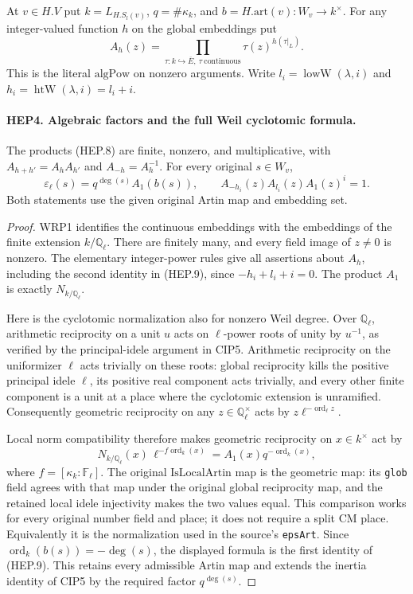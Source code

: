 At $v\in H.V$ put $k=L_{H.S_l(v)}$, $q=\#\kappa_k$, and
$b=H.\mathrm{art}(v):W_v\to k^\times$.
For any integer-valued function $h$ on the global embeddings put
\[
 A_h(z)=\prod_{\tau:k\hookrightarrow\overline E,\ \tau\ \text{continuous}}
                       \tau(z)^{h(\tau|_L)}.
 \tag{HEP.8}
\]
This is the literal $\mathrm{algPow}$ on nonzero arguments.
Write $l_i=\operatorname{lowW}(\lambda,i)$ and
$h_i=\operatorname{htW}(\lambda,i)=l_i+i$.

\paragraph{HEP4. Algebraic factors and the full Weil cyclotomic formula.}
\label{claim:HEP4}
The products (HEP.8) are finite, nonzero, and multiplicative, with
$A_{h+h'}=A_hA_{h'}$ and $A_{-h}=A_h^{-1}$.
For every original $s\in W_v$,
\[
 \varepsilon_\ell(s)=q^{\deg(s)}A_1(b(s)),\qquad
 A_{-h_i}(z)A_{l_i}(z)A_1(z)^i=1.
 \tag{HEP.9}
\]
Both statements use the given original Artin map and embedding set.
\begin{proof}
WRP1 identifies the continuous embeddings with the embeddings of
the finite extension $k/\mathbb Q_\ell$.  There are finitely many,
and every field image of $z\ne0$ is nonzero.  The elementary
integer-power rules give all assertions about $A_h$, including
the second identity in (HEP.9), since $-h_i+l_i+i=0$.
The product $A_1$ is exactly $N_{k/\mathbb Q_\ell}$.

Here is the cyclotomic normalization also for nonzero Weil degree.
Over $\mathbb Q_\ell$, arithmetic reciprocity on a unit $u$
acts on $\ell$-power roots of unity by $u^{-1}$, as verified by
the principal-idele argument in CIP5.  Arithmetic reciprocity
on the uniformizer $\ell$ acts trivially on these roots: global
reciprocity kills the positive principal idele $\ell$, its positive
real component acts trivially, and every other finite component
is a unit at a place where the cyclotomic extension is unramified.
Consequently geometric reciprocity on any
$z\in\mathbb Q_\ell^\times$ acts by
$z\ell^{-\operatorname{ord}_\ell z}$.

Local norm compatibility therefore makes geometric reciprocity on
$x\in k^\times$ act by
\[
       N_{k/\mathbb Q_\ell}(x)\,
             \ell^{-f\operatorname{ord}_k(x)}
            =A_1(x)q^{-\operatorname{ord}_k(x)},
\]
where $f=[\kappa_k:\mathbb F_\ell]$.
The original $\mathrm{IsLocalArtin}$ map is the geometric map:
its \texttt{glob} field agrees with that map under the original
global reciprocity map, and the retained local idele injectivity
makes the two values equal.  This comparison works for every
original number field and place; it does not require a split CM
place.  Equivalently it is the normalization used in the source's
\texttt{epsArt}.  Since
$\operatorname{ord}_k(b(s))=-\deg(s)$, the displayed formula is
the first identity of (HEP.9).  This retains every admissible
Artin map and extends the inertia identity of CIP5 by the required
factor $q^{\deg(s)}$.
\end{proof}

